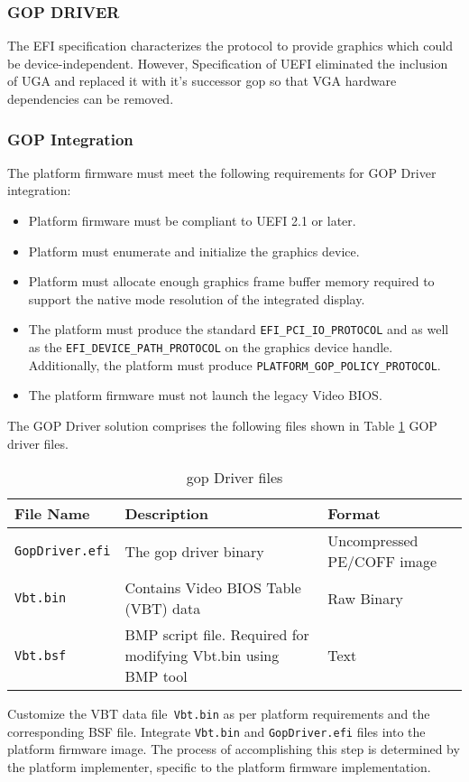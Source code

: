 \subsubsection{GOP DRIVER}
The EFI specification characterizes the  protocol to provide graphics which could be device-independent. However, Specification of UEFI eliminated the inclusion of UGA and replaced it with it's successor \gls{gop} so that VGA hardware dependencies can be removed.

\subsubsection{GOP Integration}
The platform firmware must meet the following requirements for GOP Driver integration:
\begin{itemize}
	\item Platform firmware must be compliant to UEFI 2.1 or later.
	\item Platform must enumerate and initialize the graphics device.
	\item Platform must allocate enough graphics frame buffer memory required to support the native mode resolution of the integrated display.
	\item The platform must produce the standard \verb|EFI_PCI_IO_PROTOCOL| and as well as the \verb|EFI_DEVICE_PATH_PROTOCOL| on the graphics device handle. Additionally, the platform must produce \verb|PLATFORM_GOP_POLICY_PROTOCOL|.
	\item The platform firmware must not launch the legacy Video BIOS.
\end{itemize}

The GOP Driver solution comprises the following files shown in Table \ref{table:gop-driver-files} GOP driver files.

\begin{table}
	\centering
	\renewcommand\arraystretch{2}
	\caption{\gls{gop} Driver files}\label{table:gop-driver-files}
	\begin{tabular}{l | p{5cm} | p{5cm}}
		File Name & Description & Format
		\\ \hline \hline
		\verb|GopDriver.efi| & The \gls{gop} driver binary & Uncompressed PE/COFF image
		\\ \hline
		\verb|Vbt.bin| & Contains Video BIOS Table (VBT) data & Raw Binary
		\\ \hline
		\verb|Vbt.bsf| & BMP script file. Required for modifying Vbt.bin using BMP tool & Text
		\\ \hline
	\end{tabular}
\end{table}

Customize the VBT data file\verb| Vbt.bin| as per platform requirements and the corresponding BSF file. Integrate \verb|Vbt.bin| and \verb|GopDriver.efi| files into the platform firmware image. The process of accomplishing this step is determined by the platform implementer, specific to the platform firmware implementation.
